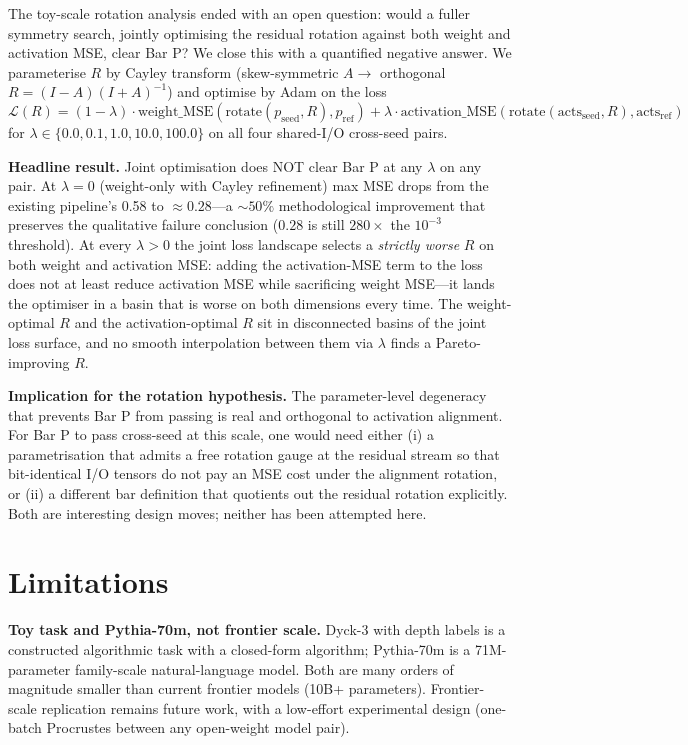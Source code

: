 \documentclass[11pt,letterpaper]{article}
\newcommand{\R}{R}
\begin{document}
The toy-scale rotation analysis ended with an open question: would a fuller symmetry search, jointly optimising the residual rotation against both weight and activation MSE, clear Bar P? We close this with a quantified negative answer. We parameterise $\R$ by Cayley transform (skew-symmetric $A \to$ orthogonal $\R = (I - A)(I + A)^{-1}$) and optimise by Adam on the loss
\[
\mathcal{L}(\R) = (1 - \lambda) \cdot \mathrm{weight\_MSE}(\mathrm{rotate}(p_{\mathrm{seed}}, \R), p_{\mathrm{ref}}) + \lambda \cdot \mathrm{activation\_MSE}(\mathrm{rotate}(\mathrm{acts}_{\mathrm{seed}}, \R), \mathrm{acts}_{\mathrm{ref}})
\]
for $\lambda \in \{0.0, 0.1, 1.0, 10.0, 100.0\}$ on all four shared-I/O cross-seed pairs.

\textbf{Headline result.} Joint optimisation does NOT clear Bar P at any $\lambda$ on any pair. At $\lambda = 0$ (weight-only with Cayley refinement) max MSE drops from the existing pipeline's 0.58 to $\approx 0.28$---a ${\sim}50\%$ methodological improvement that preserves the qualitative failure conclusion ($0.28$ is still $280\times$ the $10^{-3}$ threshold). At every $\lambda > 0$ the joint loss landscape selects a \emph{strictly worse} $\R$ on both weight and activation MSE: adding the activation-MSE term to the loss does not at least reduce activation MSE while sacrificing weight MSE---it lands the optimiser in a basin that is worse on both dimensions every time. The weight-optimal $\R$ and the activation-optimal $\R$ sit in disconnected basins of the joint loss surface, and no smooth interpolation between them via $\lambda$ finds a Pareto-improving $\R$.

\textbf{Implication for the rotation hypothesis.} The parameter-level degeneracy that prevents Bar P from passing is real and orthogonal to activation alignment. For Bar P to pass cross-seed at this scale, one would need either (i) a parametrisation that admits a free rotation gauge at the residual stream so that bit-identical I/O tensors do not pay an MSE cost under the alignment rotation, or (ii) a different bar definition that quotients out the residual rotation explicitly. Both are interesting design moves; neither has been attempted here.

\section{Limitations}
\label{sec:limits}

\textbf{Toy task and Pythia-70m, not frontier scale.} Dyck-3 with depth labels is a constructed algorithmic task with a closed-form algorithm; Pythia-70m is a 71M-parameter family-scale natural-language model. Both are many orders of magnitude smaller than current frontier models (10B+ parameters). Frontier-scale replication remains future work, with a low-effort experimental design (one-batch Procrustes between any open-weight model pair).
\end{document}
